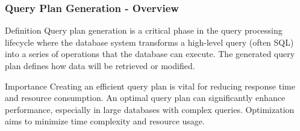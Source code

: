 \documentclass[aspectratio=169]{beamer}
\begin{document}
\begin{frame}[fragile]
    \frametitle{Query Plan Generation - Overview}
    \begin{block}{Definition}
        Query plan generation is a critical phase in the query processing lifecycle where the database system transforms a high-level query (often SQL) into a series of operations that the database can execute. The generated query plan defines how data will be retrieved or modified.
    \end{block}

    \begin{block}{Importance}
        Creating an efficient query plan is vital for reducing response time and resource consumption. An optimal query plan can significantly enhance performance, especially in large databases with complex queries. Optimization aims to minimize time complexity and resource usage.
    \end{block}
\end{frame}
\end{document}
